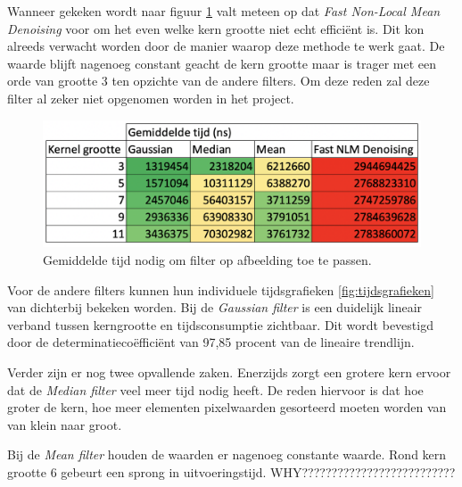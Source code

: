 Wanneer gekeken wordt naar figuur \ref{fig:tijd} valt meteen op dat \textit{Fast Non-Local Mean Denoising} voor om het even welke kern grootte niet echt efficiënt is. Dit kon alreeds verwacht worden door de manier waarop deze methode te werk gaat. De waarde blijft nagenoeg constant geacht de kern grootte maar is trager met een orde van grootte 3 ten opzichte van de andere filters. Om deze reden zal deze filter al zeker niet opgenomen worden in het project. 

\begin{figure}[h!]
    \centering
    \includegraphics[scale=0.5]{img/tijdsconsumptie}
    \caption{Gemiddelde tijd nodig om filter op afbeelding toe te passen.}
    \label{fig:tijd}
\end{figure}

Voor de andere filters kunnen hun individuele tijdsgrafieken \ref{fig:tijdsgrafieken} van dichterbij bekeken worden. 
Bij de \textit{Gaussian filter} is een duidelijk lineair verband tussen kerngrootte en tijdsconsumptie zichtbaar. Dit wordt bevestigd door de determinatiecoëfficiënt van 97,85 procent van de lineaire trendlijn. 


Verder zijn er nog twee opvallende zaken. Enerzijds zorgt een grotere kern ervoor dat de \textit{Median filter} veel meer tijd nodig heeft. De reden hiervoor is dat hoe groter de kern, hoe meer elementen pixelwaarden gesorteerd moeten worden van van klein naar groot.

Bij de \textit{Mean filter} houden de waarden er nagenoeg constante waarde. Rond kern grootte 6 gebeurt een sprong in uitvoeringstijd. 
WHY??????????????????????????

